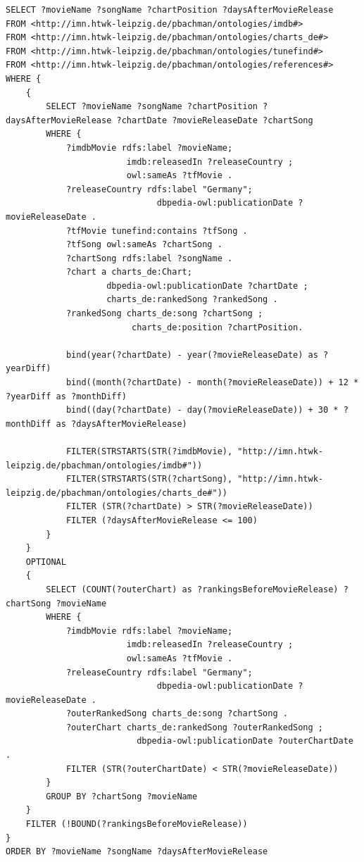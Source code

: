 \documentclass[parskip]{scrartcl}
\begin{document}
\begin{lstlisting}[caption={SPARQL-Anfrage zum Beantworten der Recherchefragestellung}, label={lst:questionSparql}]
SELECT ?movieName ?songName ?chartPosition ?daysAfterMovieRelease
FROM <http://imn.htwk-leipzig.de/pbachman/ontologies/imdb#>
FROM <http://imn.htwk-leipzig.de/pbachman/ontologies/charts_de#>
FROM <http://imn.htwk-leipzig.de/pbachman/ontologies/tunefind#>
FROM <http://imn.htwk-leipzig.de/pbachman/ontologies/references#>
WHERE { 
    {
        SELECT ?movieName ?songName ?chartPosition ?daysAfterMovieRelease ?chartDate ?movieReleaseDate ?chartSong
        WHERE {
            ?imdbMovie rdfs:label ?movieName;
                        imdb:releasedIn ?releaseCountry ;
                        owl:sameAs ?tfMovie .
            ?releaseCountry rdfs:label "Germany";
                              dbpedia-owl:publicationDate ?movieReleaseDate .
            ?tfMovie tunefind:contains ?tfSong .
            ?tfSong owl:sameAs ?chartSong .
            ?chartSong rdfs:label ?songName .
            ?chart a charts_de:Chart;
                    dbpedia-owl:publicationDate ?chartDate ;
                    charts_de:rankedSong ?rankedSong .
            ?rankedSong charts_de:song ?chartSong ;
                         charts_de:position ?chartPosition.
            
            bind(year(?chartDate) - year(?movieReleaseDate) as ?yearDiff)
            bind((month(?chartDate) - month(?movieReleaseDate)) + 12 * ?yearDiff as ?monthDiff)
            bind((day(?chartDate) - day(?movieReleaseDate)) + 30 * ?monthDiff as ?daysAfterMovieRelease)
            
            FILTER(STRSTARTS(STR(?imdbMovie), "http://imn.htwk-leipzig.de/pbachman/ontologies/imdb#"))
            FILTER(STRSTARTS(STR(?chartSong), "http://imn.htwk-leipzig.de/pbachman/ontologies/charts_de#"))
            FILTER (STR(?chartDate) > STR(?movieReleaseDate))
            FILTER (?daysAfterMovieRelease <= 100)
        }
    }
    OPTIONAL 
    {
        SELECT (COUNT(?outerChart) as ?rankingsBeforeMovieRelease) ?chartSong ?movieName
        WHERE {           
            ?imdbMovie rdfs:label ?movieName;
                        imdb:releasedIn ?releaseCountry ;
                        owl:sameAs ?tfMovie .
            ?releaseCountry rdfs:label "Germany";
                              dbpedia-owl:publicationDate ?movieReleaseDate .
            ?outerRankedSong charts_de:song ?chartSong .
            ?outerChart charts_de:rankedSong ?outerRankedSong ;
                          dbpedia-owl:publicationDate ?outerChartDate .
            FILTER (STR(?outerChartDate) < STR(?movieReleaseDate))
        }
        GROUP BY ?chartSong ?movieName
    }
    FILTER (!BOUND(?rankingsBeforeMovieRelease))
}
ORDER BY ?movieName ?songName ?daysAfterMovieRelease
\end{lstlisting}



\end{document}
